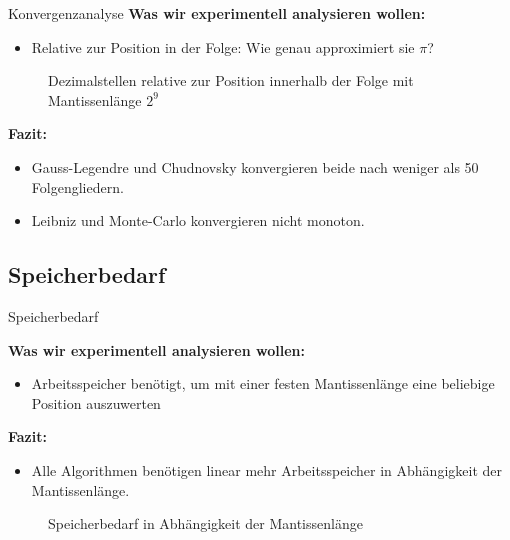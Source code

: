 \documentclass[9pt, t]{beamer}
\begin{document}
\begin{frame}{Konvergenzanalyse}
    \small
    \textbf{Was wir experimentell analysieren wollen:}
    \pause
    \begin{itemize}
        \item Relative zur Position in der Folge: Wie genau approximiert sie
              \(\pi\)?
    \end{itemize}
    \begin{figure}[H]
        \centering
        \subfloat{%
            
        }
        \subfloat{%
            
        }
        \caption{%
            Dezimalstellen relative zur Position innerhalb der Folge mit Mantissenlänge \(2^9\)
        }
    \end{figure}
    \pause
    \textbf{Fazit:}
    \begin{itemize}
        \item Gauss-Legendre und Chudnovsky konvergieren beide nach weniger als
              50 Folgengliedern.
        \item Leibniz und Monte-Carlo konvergieren nicht monoton.
    \end{itemize}
\end{frame}

\subsection{Speicherbedarf}

\begin{frame}{Speicherbedarf}
    \begin{minipage}{0.6\textwidth}
        \textbf{Was wir experimentell analysieren wollen:}
        \pause
        \begin{itemize}
            \item Arbeitsspeicher benötigt, um mit einer festen Mantissenlänge
                  eine beliebige Position auszuwerten
        \end{itemize}
        \pause
        \textbf{Fazit:}
        \begin{itemize}
            \item Alle Algorithmen benötigen linear mehr Arbeitsspeicher in
                  Abhängigkeit der Mantissenlänge.
        \end{itemize}
    \end{minipage}
    \hfill
    \begin{minipage}{0.39\textwidth}
        \begin{figure}[H]
            \centering
            
            \caption{Speicherbedarf in Abhängigkeit der Mantissenlänge}
        \end{figure}
    \end{minipage}
\end{frame}
\end{document}
